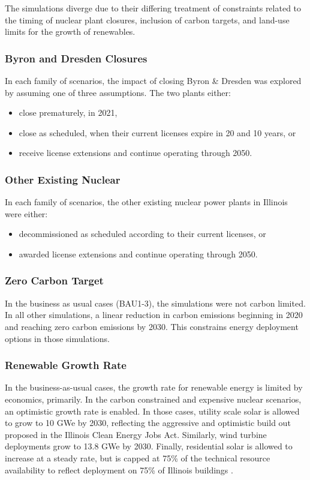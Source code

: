 The simulations diverge due to their differing treatment of constraints related 
to the timing of nuclear plant closures, inclusion of 
carbon targets, and land-use limits for the growth of renewables.

\subsubsection{Byron and Dresden Closures}
In each family of scenarios, the impact of closing Byron \& Dresden was explored 
by assuming one of three assumptions. The two plants either:
\begin{itemize} 
        \item close prematurely, in 2021,
        \item close as scheduled, when their current licenses expire in 20 and 10 
        years, or
        \item receive license extensions and continue operating through 2050.
\end{itemize}


\subsubsection{Other Existing Nuclear}
In each family of scenarios, the other existing nuclear power plants in 
Illinois were  either:
\begin{itemize}
        \item decommissioned as scheduled according to their current 
licenses, or 
        \item awarded license extensions and continue operating through 2050.
\end{itemize}

\subsubsection{Zero Carbon Target}
In the business as usual cases (\gls{BAU}1-3), the simulations were not carbon limited. In all 
other simulations, a linear reduction in carbon emissions beginning in 2020 and 
reaching zero carbon emissions by 2030. This constrains energy 
deployment options in those simulations.

\subsubsection{Renewable Growth Rate}
In the business-as-usual cases, the growth rate for renewable energy is limited by economics, 
primarily. In the carbon constrained and expensive nuclear scenarios, an 
optimistic growth rate is enabled.
In those cases, utility scale solar is allowed to grow to 10 GWe by 2030, 
reflecting the aggressive and optimistic build out proposed in the Illinois 
Clean Energy Jobs Act. Similarly, wind turbine deployments grow to 13.8 GWe 
by 2030. Finally, residential solar is allowed to 
increase at a steady rate, but is capped at 75\% of the technical resource 
availability to reflect deployment on 75\% of Illinois buildings 
\cite{gagnon_rooftop_2016}. 


